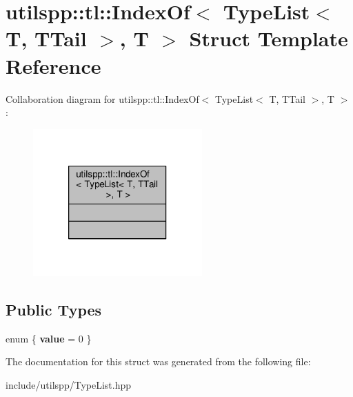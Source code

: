 \hypertarget{structutilspp_1_1tl_1_1IndexOf_3_01TypeList_3_01T_00_01TTail_01_4_00_01T_01_4}{\section{utilspp\-:\-:tl\-:\-:Index\-Of$<$ Type\-List$<$ T, T\-Tail $>$, T $>$ Struct Template Reference}
\label{structutilspp_1_1tl_1_1IndexOf_3_01TypeList_3_01T_00_01TTail_01_4_00_01T_01_4}
}


Collaboration diagram for utilspp\-:\-:tl\-:\-:Index\-Of$<$ Type\-List$<$ T, T\-Tail $>$, T $>$\-:\nopagebreak
\begin{figure}[H]
\begin{center}
\leavevmode
\includegraphics[width=184pt]{structutilspp_1_1tl_1_1IndexOf_3_01TypeList_3_01T_00_01TTail_01_4_00_01T_01_4__coll__graph}
\end{center}
\end{figure}
\subsection*{Public Types}
\begin{DoxyCompactItemize}
\item 
enum \{ {\bfseries value} = 0
 \}
\end{DoxyCompactItemize}


The documentation for this struct was generated from the following file\-:\begin{DoxyCompactItemize}
\item 
include/utilspp/Type\-List.\-hpp\end{DoxyCompactItemize}
